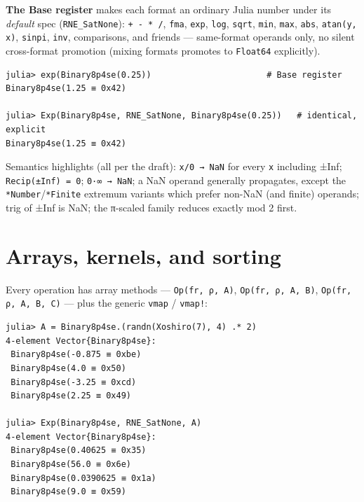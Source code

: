 \textbf{The Base register} makes each format an ordinary Julia number under its \emph{default} spec (\texttt{RNE\_SatNone}): \texttt{+ - * /}, \texttt{fma}, \texttt{exp}, \texttt{log}, \texttt{sqrt}, \texttt{min}, \texttt{max}, \texttt{abs}, \texttt{atan(y, x)}, \texttt{sinpi}, \texttt{inv}, comparisons, and friends — same-format operands only, no silent cross-format promotion (mixing formats promotes to \texttt{Float64} explicitly).




\begin{verbatim}
julia> exp(Binary8p4se(0.25))                       # Base register
Binary8p4se(1.25 ≡ 0x42)

julia> Exp(Binary8p4se, RNE_SatNone, Binary8p4se(0.25))   # identical, explicit
Binary8p4se(1.25 ≡ 0x42)
\end{verbatim}



Semantics highlights (all per the draft): \texttt{x/0 → NaN} for every \texttt{x} including ±Inf; \texttt{Recip(±Inf) = 0}; \texttt{0·∞ → NaN}; a NaN operand generally propagates, except the \texttt{*Number}/\texttt{*Finite} extremum variants which prefer non-NaN (and finite) operands; trig of ±Inf is NaN; the π-scaled family reduces exactly mod 2 first.



\section{Arrays, kernels, and sorting}



\label{12068187713603161220}{}


Every operation has array methods — \texttt{Op(fr, ρ, A)}, \texttt{Op(fr, ρ, A, B)}, \texttt{Op(fr, ρ, A, B, C)} — plus the generic \texttt{vmap} / \texttt{vmap!}:




\begin{verbatim}
julia> A = Binary8p4se.(randn(Xoshiro(7), 4) .* 2)
4-element Vector{Binary8p4se}:
 Binary8p4se(-0.875 ≡ 0xbe)
 Binary8p4se(4.0 ≡ 0x50)
 Binary8p4se(-3.25 ≡ 0xcd)
 Binary8p4se(2.25 ≡ 0x49)

julia> Exp(Binary8p4se, RNE_SatNone, A)
4-element Vector{Binary8p4se}:
 Binary8p4se(0.40625 ≡ 0x35)
 Binary8p4se(56.0 ≡ 0x6e)
 Binary8p4se(0.0390625 ≡ 0x1a)
 Binary8p4se(9.0 ≡ 0x59)
\end{verbatim}



